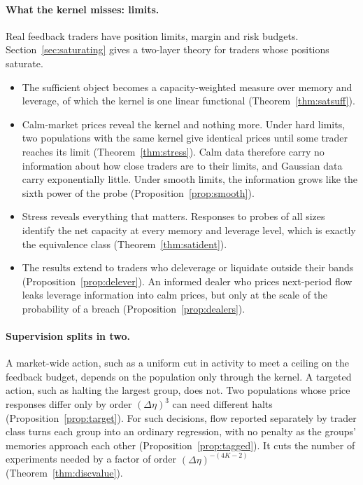\documentclass[12pt]{article}
\theoremstyle{definition}
\theoremstyle{remark}
\begin{document}
\paragraph{What the kernel misses: limits.} Real feedback traders have position limits, margin and risk budgets. Section~\ref{sec:saturating} gives a two-layer theory for traders whose positions saturate.
\begin{itemize}[itemsep=1pt,topsep=2pt]
\item The sufficient object becomes a capacity-weighted measure over memory and leverage, of which the kernel is one linear functional (Theorem~\ref{thm:satsuff}).
\item Calm-market prices reveal the kernel and nothing more. Under hard limits, two populations with the same kernel give identical prices until some trader reaches its limit (Theorem~\ref{thm:stress}). Calm data therefore carry no information about how close traders are to their limits, and Gaussian data carry exponentially little. Under smooth limits, the information grows like the sixth power of the probe (Proposition~\ref{prop:smooth}).
\item Stress reveals everything that matters. Responses to probes of all sizes identify the net capacity at every memory and leverage level, which is exactly the equivalence class (Theorem~\ref{thm:satident}).
\item The results extend to traders who deleverage or liquidate outside their bands (Proposition~\ref{prop:delever}). An informed dealer who prices next-period flow leaks leverage information into calm prices, but only at the scale of the probability of a breach (Proposition~\ref{prop:dealers}).
\end{itemize}

\paragraph{Supervision splits in two.} A market-wide action, such as a uniform cut in activity to meet a ceiling on the feedback budget, depends on the population only through the kernel. A targeted action, such as halting the largest group, does not. Two populations whose price responses differ only by order $(\Delta\eta)^3$ can need different halts (Proposition~\ref{prop:target}). For such decisions, flow reported separately by trader class turns each group into an ordinary regression, with no penalty as the groups' memories approach each other (Proposition~\ref{prop:tagged}). It cuts the number of experiments needed by a factor of order $(\Delta\eta)^{-(4K-2)}$ (Theorem~\ref{thm:discvalue}).
\end{document}
